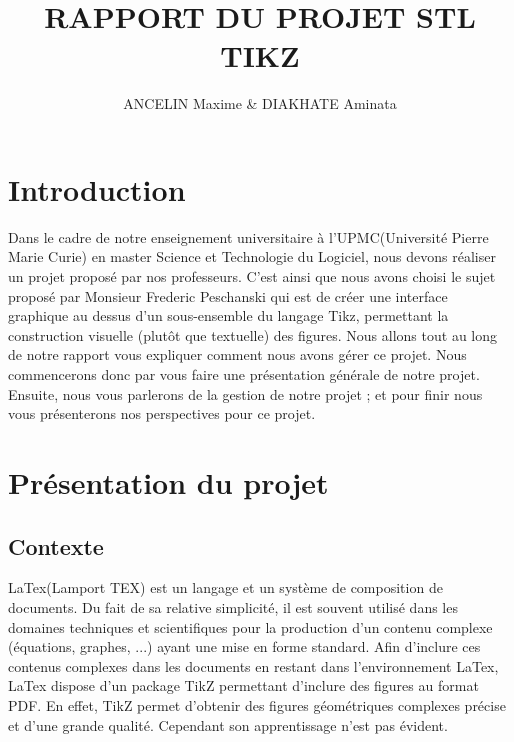\documentclass[a4paper]{report}
\title{RAPPORT DU PROJET STL \\ TIKZ}
\author{ANCELIN Maxime & DIAKHATE Aminata}
\begin{document}
\titleformat{\chapter}[hang]{\bf\huge}{\thechapter}{2pc}{} 

\tableofcontents
\newpage


 \newpage
 \chapter{Introduction}
  Dans le cadre de notre enseignement universitaire à l'UPMC(Université Pierre Marie Curie) en master Science et Technologie du Logiciel, nous devons réaliser un projet proposé par nos professeurs. C'est ainsi que nous avons choisi le sujet proposé par Monsieur Frederic Peschanski qui est de créer une interface graphique au dessus d'un sous-ensemble du langage Tikz, permettant la construction visuelle (plutôt que textuelle) des figures. 
  \newline
  Nous allons tout au long de notre rapport vous expliquer comment nous avons gérer ce projet. Nous commencerons donc par vous faire une présentation générale de notre projet. Ensuite, nous vous parlerons de la gestion de notre projet ; et pour finir nous vous présenterons nos perspectives pour ce projet.
  
  \chapter{Présentation du projet}
  \section{Contexte}
  LaTex(Lamport TEX) est un langage et un système de composition de documents. Du fait de sa relative simplicité, il est souvent utilisé dans les domaines techniques et scientifiques pour la production d'un contenu complexe (équations, graphes, ...) ayant une mise en forme standard. Afin d'inclure ces contenus complexes dans les documents en restant dans l'environnement LaTex, LaTex dispose d'un package TikZ permettant d'inclure des figures au format PDF. En effet, TikZ permet d'obtenir des figures géométriques complexes précise et d'une grande qualité. Cependant son apprentissage n'est pas évident. 
\end{document}
